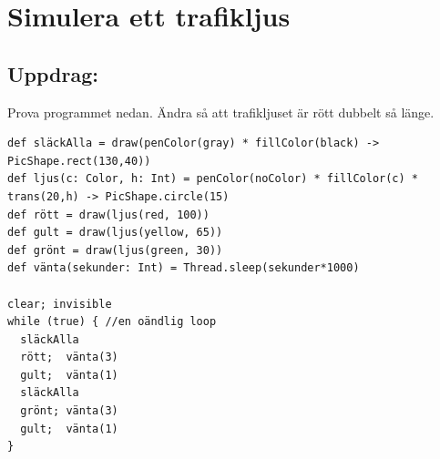\chapter{Simulera ett trafikljus}\section*{\color{BrickRed}Uppdrag:}
Prova programmet nedan. Ändra så att trafikljuset är rött dubbelt så länge.

  

\begin{lstlisting}[basicstyle={\ttfamily\fontsize{14}{17}\selectfont},numbers=none]
def släckAlla = draw(penColor(gray) * fillColor(black) -> PicShape.rect(130,40))
def ljus(c: Color, h: Int) = penColor(noColor) * fillColor(c) * trans(20,h) -> PicShape.circle(15)
def rött = draw(ljus(red, 100))
def gult = draw(ljus(yellow, 65))
def grönt = draw(ljus(green, 30))
def vänta(sekunder: Int) = Thread.sleep(sekunder*1000)

clear; invisible  
while (true) { //en oändlig loop
  släckAlla
  rött;  vänta(3)
  gult;  vänta(1) 
  släckAlla
  grönt; vänta(3)
  gult;  vänta(1)
}
\end{lstlisting}
        
